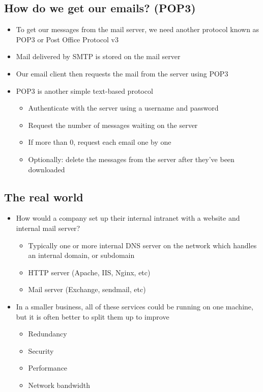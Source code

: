 \subsection*{How do we get our emails? (POP3)}

\begin{itemize}
  \item To get our messages from the mail server, we need another protocol known as POP3 or Post Office Protocol v3
  \item Mail delivered by SMTP is stored on the mail server
  \item Our email client then requests the mail from the server using POP3
  \item POP3 is another simple text-based protocol
  \begin{itemize}
    \item Authenticate with the server using a username and password
    \item Request the number of messages waiting on the server
    \item If more than 0, request each email one by one
    \item Optionally: delete the messages from the server after they've been downloaded
  \end{itemize}
\end{itemize}

\subsection*{The real world}

\begin{itemize}
  \item How would a company set up their internal intranet with a website and internal mail server?
  \begin{itemize}
    \item Typically one or more internal DNS server on the network which handles an internal domain, or subdomain
    \item HTTP server (Apache, IIS, Nginx, etc)
    \item Mail server (Exchange, sendmail, etc)
  \end{itemize}
  \item In a smaller business, all of these services could be running on one machine, but it is often better to split them up to improve
  \begin{itemize}
    \item Redundancy
    \item Security
    \item Performance
    \item Network bandwidth
  \end{itemize}
\end{itemize}

